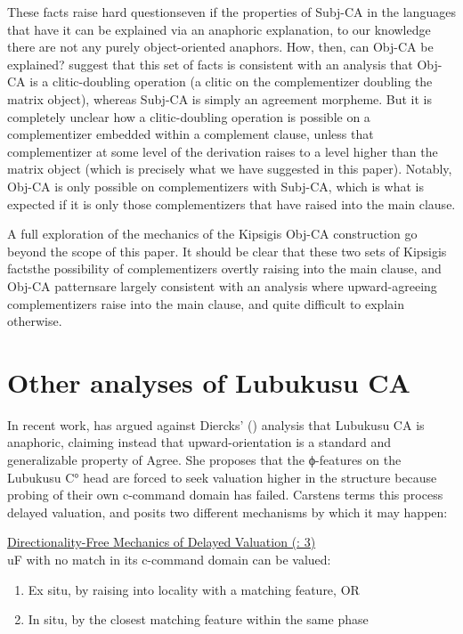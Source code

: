 These facts raise hard questions\textemdash even if the properties of Subj-CA in the languages that have it can be explained via an anaphoric explanation, to our knowledge there are not any purely object-oriented anaphors. How, then, can Obj-CA be explained? \citet{DiercksRao:2017} suggest that this set of facts is consistent with an analysis that Obj-CA is a clitic-doubling operation (a clitic on the complementizer doubling the matrix object), whereas Subj-CA is simply an agreement morpheme. But it is completely unclear how a clitic-doubling operation is possible on a complementizer embedded within a complement clause, unless that complementizer at some level of the derivation raises to a level higher than the matrix object (which is precisely what we have suggested in this paper). Notably, Obj-CA is only possible on complementizers with Subj-CA, which is what is expected if it is only those complementizers that have raised into the main clause.  

A full exploration of the mechanics of the Kipsigis Obj-CA construction go beyond the scope of this paper. It should be clear that these two sets of Kipsigis facts\textemdash the possibility of complementizers overtly raising into the main clause, and Obj-CA patterns\textemdash are largely consistent with an analysis where upward-agreeing complementizers raise into the main clause, and quite difficult to explain otherwise. 

\section{Other analyses of Lubukusu CA }\label{sectioncarstens}

In recent work, \citet{Carstens:2016} has argued against Diercks’ (\citeyear{Diercks:2013}) analysis that Lubukusu CA is anaphoric, claiming instead that upward-orientation is a standard and generalizable property of Agree. She proposes that the ϕ-features on the Lubukusu C° head are forced to seek valuation higher in the structure because probing of their own c-command domain has failed. Carstens terms this process delayed valuation, and posits two different mechanisms by which it may happen:

\ea \underline{Directionality-Free Mechanics of Delayed Valuation (\citealt{Carstens:2016}: 3)}\\
	uF with no match in its c-command domain can be valued: \\
\begin{enumerate}
\item Ex situ, by raising into locality with a matching feature, OR
\item In situ, by the closest matching feature within the same phase
\end{enumerate}
\z

